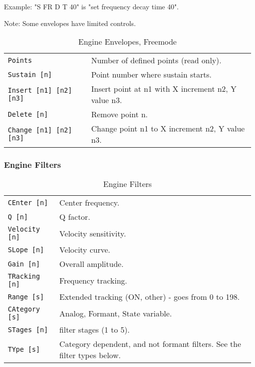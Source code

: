 Example: "S FR D T 40" is "set frequency decay time 40".

Note: Some envelopes have limited controls.

   \begin{table}[H]
      \centering
      \caption{Engine Envelopes, Freemode}
      \label{table:yoshimi_engine_envelopes_freemode}
      \begin{tabular}{l l}

\texttt{Points} &
   Number of defined points (read only). \\
\texttt{Sustain [n]} &
   Point number where sustain starts. \\
\texttt{Insert [n1] [n2] [n3]} &
   Insert point at n1 with X increment n2, Y value n3. \\
\texttt{Delete [n]} &
   Remove point n. \\
\texttt{Change [n1] [n2] [n3]} &
   Change point n1 to X increment n2, Y value n3. \\

      \end{tabular}
   \end{table}

\subsubsection{Engine Filters}
\label{subsec:command_line_engine_filters}

   \begin{table}[H]
      \centering
      \caption{Engine Filters}
      \label{table:yoshimi_engine_filters}
      \begin{tabular}{l l}

\texttt{CEnter [n]} &
   Center frequency. \\
\texttt{Q [n]} &
   Q factor.   \\
\texttt{Velocity [n]} &
   Velocity sensitivity.   \\
\texttt{SLope [n]} &
   Velocity curve.   \\
\texttt{Gain [n]} &
   Overall amplitude.   \\
\texttt{TRacking [n]} &
   Frequency tracking.  \\
\texttt{Range [s]} &
   Extended tracking (ON, {other}) - goes from 0 to 198. \\
\texttt{CAtegory [s]} &
   Analog, Formant, State variable. \\
\texttt{STages [n]} &
   filter stages (1 to 5). \\
\texttt{TYpe [s]} &
   Category dependent, and not formant filters.  See the filter types below.   \\

      \end{tabular}
   \end{table}

